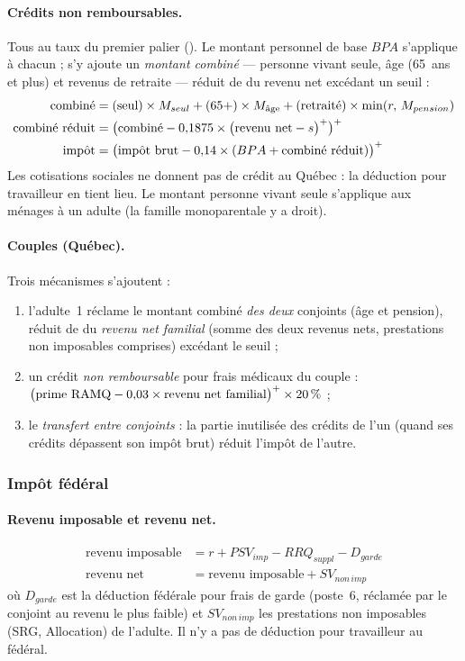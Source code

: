\paragraph{Crédits non remboursables.} Tous au taux du premier palier
(). Le montant personnel de base $BPA$ s'applique à chacun ; s'y
ajoute un \emph{montant combiné} --- personne vivant seule, âge (65~ans et
plus) et revenus de retraite --- réduit de  du revenu net
excédant un seuil :
\begin{align*}
\text{combiné} &= \mathrm{(seul)} \times M_{seul}
 + \mathrm{(65+)} \times M_{\text{âge}}
 + \text{(retraité)} \times \min(r,\, M_{pension}) \\
\text{combiné réduit} &= \bigl(\text{combiné}
 - 0{,}1875 \times \bigl(\text{revenu net} - s\bigr)^{+}\bigr)^{+} \\
\text{impôt} &= \bigl(\text{impôt brut}
 - 0{,}14 \times (BPA + \text{combiné réduit})\bigr)^{+}
\end{align*}
Les cotisations sociales ne donnent pas de crédit au Québec : la déduction
pour travailleur en tient lieu. Le montant \og personne vivant seule \fg{}
s'applique aux ménages à un adulte (la famille monoparentale y a droit).

\paragraph{Couples (Québec).} Trois mécanismes s'ajoutent :
\begin{enumerate}
  \item l'adulte~1 réclame le montant combiné \emph{des deux} conjoints
        (âge et pension), réduit de  du \emph{revenu net
        familial} (somme des deux revenus nets, prestations non imposables
        comprises) excédant le seuil ;
  \item un crédit \emph{non remboursable} pour frais médicaux du couple :
        $\bigl(\text{prime RAMQ} - 0{,}03 \times \text{revenu net
        familial}\bigr)^{+} \times \num{20}\,\%$ ;
  \item le \emph{transfert entre conjoints} : la partie inutilisée des
        crédits de l'un (quand ses crédits dépassent son impôt brut)
        réduit l'impôt de l'autre.
\end{enumerate}

\subsubsection*{Impôt fédéral}

\paragraph{Revenu imposable et revenu net.}
\begin{align*}
\text{revenu imposable} &= r + PSV_{imp} - RRQ_{suppl} - D_{garde} \\
\text{revenu net} &= \text{revenu imposable} + SV_{non\,imp}
\end{align*}
où $D_{garde}$ est la déduction fédérale pour frais de garde (poste~6,
réclamée par le conjoint au revenu le plus faible) et $SV_{non\,imp}$ les
prestations non imposables (SRG, Allocation) de l'adulte. Il n'y a pas de
déduction pour travailleur au fédéral.

